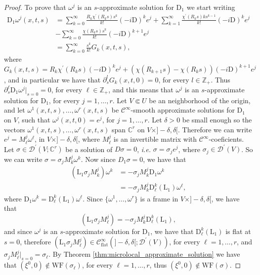 \documentclass[11pt]{amsart}
\theoremstyle{definition}
\theoremstyle{remark}
\theoremstyle{plain}
\begin{document}
\begin{proof}
{	To prove that ${\omega}^j$ is an $s$-approximate solution for $\mathrm{D}_1$ we start writing
	\begin{align*}
		\mathrm{D}_1 {\omega}^j(x,t,s) &= \sum_{k=0}^\infty \frac{ R_k \chi^\prime (R_k s)s^{k}}{k!}(-i\mathrm{D})^k e^j + \sum_{k=1}^\infty \frac{\chi^\prime(R_k s)k s^{k-1}}{k!} (-i\mathrm{D})^k e^j \\
		& - \sum_{k=0}^\infty \frac{\chi(R_k s) s^k}{k!}(-i\mathrm{D})^{k+1} e^j \\
		& = \sum_{k=0}^\infty \frac{s^k}{k!}G_k(x,t,s),
	\end{align*}
	where $G_k(x,t,s) = R_k \chi^\prime(R_k s)(-i\mathrm{D})^k e^j + (\chi(R_{k+1} s) - \chi(R_k s))(-i\mathrm{D})^{k+1} e^j$, and in particular we have that $\partial_s^l G_k(x,t,0) = 0$, for every $l \in \mathbb{Z}_+$. Thus $\partial_s^\ell \mathrm{D}_1 {\omega}^j\big|_{s=0} = 0$, for every $\ell \in \mathbb{Z}_+$, and this means that ${\omega}^j$ is an $s$-approximate solution for $\mathrm{D}_1$, for every $j =1, \dots,r$.
	}
Let $V \Subset U$ be an neighborhood of the origin, and let ${\omega}^1(x,t,s), \dots, {\omega}^r(x,t,s)$ be $\mathcal{C}^\infty$-smooth approximate solutions for $\mathrm{D}_1$ on $V$, such that $\omega^j(x,t,0) = e^j$, for $j = 1, \dots, r$. Let $\delta>0$ be small enough so 
the vectors  ${\omega}^1(x,t,s), \dots, {\omega}^r(x,t,s)$ span $\mathbb{C}^r$ on $V \times ]-\delta , \delta[$. Therefore we can write $e^j = M_\ell^j \omega^\ell $, in $V \times]-\delta,\delta[$, where $M_\ell^j$ is an invertible matrix with $\mathcal{C}^\infty$-coeficients. Let $\sigma \in \mathcal{D}^\prime(V;\mathbb{C}^r)$ be a solution of $D\sigma =0$, \textit{i.e.} $\sigma = \sigma_j e^j$, where $\sigma_j \in \mathcal{D}^\prime(V)$. So we can write $\sigma = \sigma_j M_k^j \omega^k$. Now since $D_1\sigma = 0$, we have that
%
\begin{align*}
	(\mathrm{L}_1 \sigma_j M_k^j) \omega^k & = -  \sigma_j M_k^j \mathrm{D}_1 \omega^k\\
	& = - \sigma_j M_k^j \mathrm{D}_\ell^k(\mathrm{L}_1) \omega^\ell,
\end{align*}
%
where $\mathrm{D}_1 \omega^k =  \mathrm{D}_\ell^k(\mathrm{L}_1) \omega^\ell$. Since $\{\omega^1, \dots, \omega^r\}$ is a frame in $V\times]-\delta,\delta[$, we have that
%
\begin{equation*}
	(\mathrm{L}_1 \sigma_j M_\ell^j) = -  \sigma_j M_k^j \mathrm{D}_\ell^k(\mathrm{L}_1),
\end{equation*}
%
and since $\omega^j$ is an $s$-approximate solution for $\mathrm{D}_1$, we have that $\mathrm{D}_\ell^k(\mathrm{L}_1)$ is flat at $s=0$, therefore $(\mathrm{L}_1 \sigma_j M_\ell^j) \in \mathcal{C}_\text{flat}^\infty(]-\delta, \delta[; \mathcal{D}^\prime(V))$, for every $\ell = 1, \dots,r$, and $\sigma_j M_\ell^j\big|_{s=0} = \sigma_\ell$. By Theorem \ref{thm:microlocal_approximate_solution} we have that $(\xi^0,0) \notin \mathrm{WF}(\sigma_\ell)$, for every $\ell=1,\dots,r$, thus $(\xi^0,0) \notin \mathrm{WF}(\sigma)$.		 
\end{proof}
%
%
%
\end{document}
